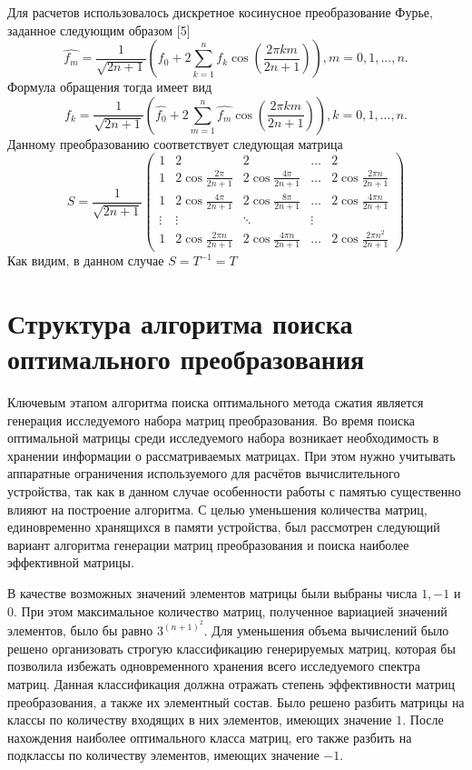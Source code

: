 \documentclass[11pt, oneside, a4paper]{article}
\begin{document}
Для расчетов использовалось дискретное косинусное преобразование Фурье, заданное следующим образом [5]
\begin{equation}
\label{DCT}
\hat{f_m}=\frac{1}{\sqrt{2n+1}}(f_0+2\sum\limits_{k=1}^{n}f_k\cos(\frac{2 \pi k m}{2n+1})), m=0,1,...,n.
\end{equation}
Формула обращения тогда имеет вид
\begin{equation}
\label{inverseDCT}
f_k=\frac{1}{\sqrt{2n+1}}(\hat{f_0}+2\sum\limits_{m=1}^{n}\hat{f_m}\cos(\frac{2 \pi k m}{2n+1})), k=0,1,...,n.
\end{equation}
Данному преобразованию соответствует следующая матрица
\begin{equation}
\label{matrixDCT}
S = \frac{1}{\sqrt{2n+1}}\begin{pmatrix}
1 & 2 & 2 & \ldots & 2\\
1 & 2\cos\frac{2 \pi}{2n+1} & 2\cos\frac{4 \pi}{2n+1} & \ldots & 2\cos\frac{2 \pi n}{2n+1}\\
1 & 2\cos\frac{4 \pi}{2n+1} & 2\cos\frac{8 \pi}{2n+1} & \ldots & 2\cos\frac{4 \pi n}{2n+1}\\
\vdots & \vdots & \ddots & \vdots\\
1 & 2\cos\frac{2 \pi n}{2n+1} & 2\cos\frac{4 \pi n}{2n+1} & \ldots & 2\cos\frac{2 \pi n^2}{2n+1}
\end{pmatrix}
\end{equation}
Как видим, в данном случае $S=T^{-1}=T$

\section{Структура алгоритма поиска оптимального преобразования}

Ключевым этапом алгоритма поиска оптимального метода сжатия является генерация исследуемого набора матриц преобразования. Во время поиска оптимальной матрицы среди исследуемого набора возникает необходимость в хранении информации о рассматриваемых матрицах. При этом нужно                   учитывать аппаратные ограничения используемого для расчётов вычислительного устройства, так как в данном случае особенности работы с памятью существенно влияют на построение алгоритма. С целью уменьшения количества матриц, единовременно хранящихся в памяти устройства, был рассмотрен следующий вариант алгоритма генерации матриц преобразования и поиска наиболее эффективной матрицы.

В качестве возможных значений элементов матрицы были выбраны числа $1, -1$ и $0$. При этом максимальное количество матриц, полученное вариацией значений элементов, было бы равно $3^{(n+1)^2}$. Для уменьшения объема вычислений было решено организовать строгую классификацию генерируемых матриц, которая бы позволила избежать одновременного хранения всего исследуемого спектра матриц. Данная классификация должна отражать степень эффективности матриц преобразования, а также их элементный состав. Было решено разбить матрицы на классы по количеству входящих в них элементов, имеющих значение $1$. После нахождения наиболее оптимального класса матриц, его также разбить на подклассы по количеству элементов, имеющих значение $-1$.
\end{document}
